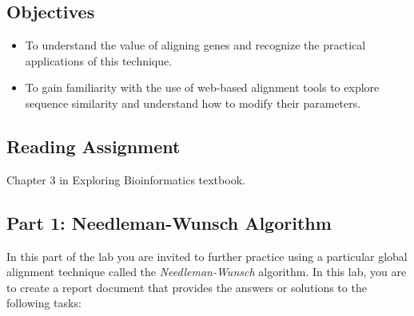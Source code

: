 

\long{}



\vspace*{-.1in}
\subsection*{Objectives}
\vspace*{-.1in}

\begin{itemize}
	\item To understand the value of aligning genes and recognize the practical applications of this technique.
	\item To gain familiarity with the use of web-based alignment tools to explore sequence similarity and understand how to modify their parameters.

\end{itemize}

\vspace*{-.1in}
\subsection*{Reading Assignment}
\vspace*{-.1in}
Chapter 3 in Exploring Bioinformatics textbook.

\vspace*{-.1in}
\subsection*{Part 1:  Needleman-Wunsch Algorithm}
\vspace*{-.1in} 


In this part of the lab you are invited to further practice using a particular global alignment technique called the \emph{Needleman-Wunsch} algorithm. In this lab, you are to create a report document that provides the answers or solutions to the following tasks:


